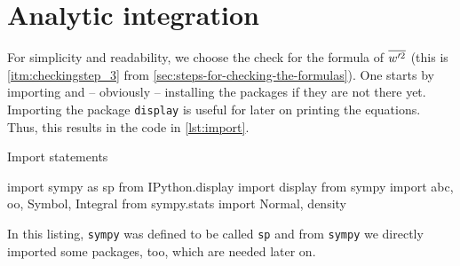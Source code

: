 \section{Analytic integration}\label{sec:analytic-integration}

For simplicity and readability, we choose the check for the formula of $\overline{w'^2}$
(this is \cref{itm:checkingstep_3} from \cref{sec:steps-for-checking-the-formulas}).
One starts by importing and -- obviously -- installing the packages if they are not there yet.
Importing the package \texttt{display} is useful for later on printing the equations.
Thus, this results in the code in \cref{lst:import}.
\begin{listing}[!ht]
    \caption{Import statements}
    \label{lst:import}
    \begin{pythoncode}
        import sympy as sp
        from IPython.display import display
        from sympy import abc, oo, Symbol, Integral
        from sympy.stats import Normal, density
    \end{pythoncode}
\end{listing}
In this listing,
\texttt{sympy} was defined to be called \texttt{sp}
and from \texttt{sympy} we directly imported some packages,
too, which are needed later on.

